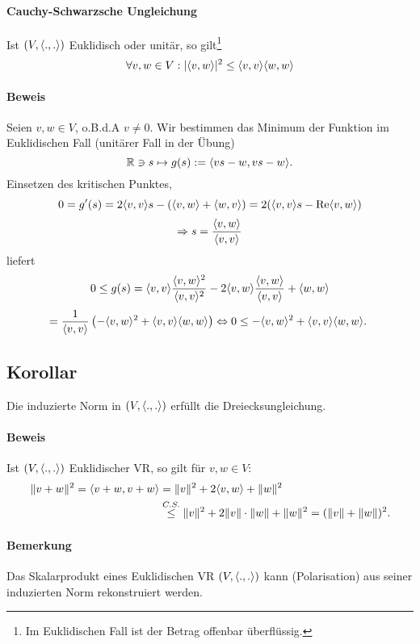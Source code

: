 \paragraph{Cauchy-Schwarzsche Ungleichung}
\begin{Satz}
	Ist $ (V,\langle .,. \rangle) $ Euklidisch oder unitär, so gilt\footnote{Im Euklidischen Fall ist der Betrag offenbar überflüssig.}
		\[ \forall v,w\in V: |\langle v,w \rangle|^2 \leq \langle v,v \rangle\langle w,w \rangle \]
\end{Satz}
\paragraph{Beweis}
	Seien $ v,w\in V $, o.B.d.A $ v\neq 0 $. Wir bestimmen das Minimum der Funktion im Euklidischen Fall (unitärer Fall in der Übung)
		\[ \mathbb{R} \ni s\mapsto g(s):= \langle vs-w,vs-w \rangle. \]
	Einsetzen des kritischen Punktes,
		\[ 0 = g'(s) = 2\langle v,v \rangle s -(\langle v,w \rangle+\langle w,v \rangle) = 2(\langle v,v \rangle s-\operatorname{Re} \langle v,w \rangle) \]
		\[ \Rightarrow s = \frac{\langle v,w \rangle}{\langle v,v \rangle} \]
	liefert
		\[ 0\leq g(s) = \langle v,v \rangle\frac{\langle v,w \rangle^2}{\langle v,v \rangle^2}-2\langle v,w \rangle\frac{\langle v,w \rangle}{\langle v,v \rangle}+\langle w,w \rangle \]
		\[ = \frac{1}{\Skl{v}{v}}\left(-\Skl{v}{w}^2+\Skl{v}{v}\Skl{w}{w} \right) \Leftrightarrow 0\leq -\Skl{v}{w}^2+\Skl{v}{v}\Skl{w}{w}. \ \]
		
\subsection{Korollar}
\begin{Korollar}[]
	Die induzierte Norm in $ (V,\langle .,. \rangle) $ erfüllt die Dreiecksungleichung.
\end{Korollar}
\paragraph{Beweis}
	Ist $ (V,\langle .,. \rangle) $ Euklidischer VR, so gilt für $ v,w\in V $:
		\begin{align*}
		\|v+w\|^2 = \langle v+w,v+w \rangle &= \|v\|^2+2\langle v,w \rangle+\|w\|^2 \\
		&\overset{C.S.}{\leq} \|v\|^2+2\|v\|\cdot \|w\|+\|w\|^2 = (\|v\|+\|w\|)^2.
		\end{align*}
\paragraph{Bemerkung}
	Das Skalarprodukt eines Euklidischen VR $ (V,\langle .,. \rangle) $ kann (Polarisation) aus seiner induzierten Norm rekonstruiert werden.
	
